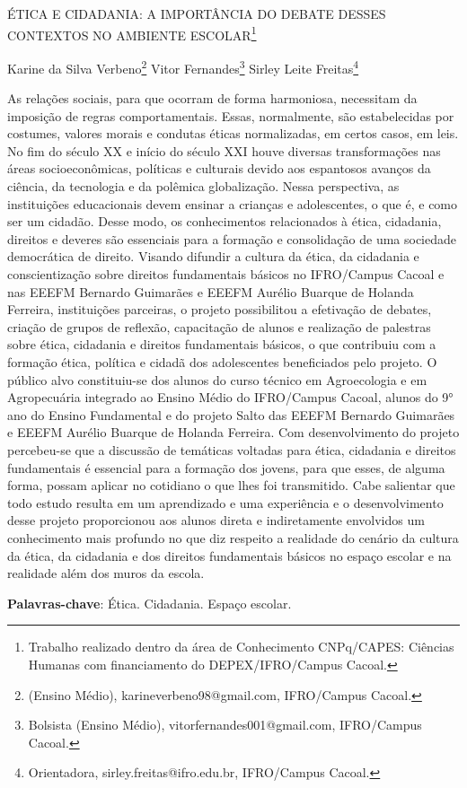 \documentclass[article,12pt,onesidea,4paper,english,brazil]{abntex2}
\begin{document}
	
	
	\frenchspacing 
	
	\begin{center}
		\LARGE ÉTICA E CIDADANIA: A IMPORTÂNCIA DO DEBATE DESSES CONTEXTOS NO AMBIENTE ESCOLAR\footnote{Trabalho realizado dentro da área de Conhecimento CNPq/CAPES: Ciências Humanas com financiamento do DEPEX/IFRO/Campus Cacoal.}
		
		\normalsize
		Karine da Silva Verbeno\footnote{(Ensino Médio), karineverbeno98@gmail.com, IFRO/Campus Cacoal.} 
		Vitor Fernandes\footnote{Bolsista (Ensino Médio), vitorfernandes001@gmail.com, IFRO/Campus Cacoal.} 
		Sirley Leite Freitas\footnote{Orientadora, sirley.freitas@ifro.edu.br, IFRO/Campus Cacoal.} 
	\end{center}
	
	\noindent As relações sociais, para que ocorram de forma harmoniosa, necessitam da imposição de regras comportamentais. Essas, normalmente, são estabelecidas por costumes, valores morais e condutas éticas normalizadas, em certos casos, em leis. No fim do século XX e início do século XXI houve diversas transformações nas áreas socioeconômicas, políticas e culturais devido aos espantosos avanços da ciência, da tecnologia e da polêmica globalização. Nessa perspectiva, as instituições educacionais devem ensinar a crianças e adolescentes, o que é, e como ser um cidadão. Desse modo, os conhecimentos relacionados à ética, cidadania, direitos e deveres são essenciais para a formação e consolidação de uma sociedade democrática de direito. Visando difundir a cultura da ética, da cidadania e conscientização sobre direitos fundamentais básicos no IFRO/Campus Cacoal e nas EEEFM Bernardo Guimarães e EEEFM Aurélio Buarque de Holanda Ferreira, instituições parceiras, o projeto possibilitou a efetivação de debates, criação de grupos de reflexão, capacitação de alunos e realização de palestras sobre ética, cidadania e direitos fundamentais básicos, o que contribuiu com a formação ética, política e cidadã dos adolescentes beneficiados pelo projeto. O público alvo constituiu-se dos alunos do curso técnico em Agroecologia e em Agropecuária integrado ao Ensino Médio do IFRO/Campus Cacoal, alunos do 9° ano do Ensino Fundamental e do projeto Salto das EEEFM Bernardo Guimarães e EEEFM Aurélio Buarque de Holanda Ferreira. Com desenvolvimento do projeto percebeu-se que a discussão de temáticas voltadas para ética, cidadania e direitos fundamentais é essencial para a formação dos jovens, para que esses, de alguma forma, possam aplicar no cotidiano o que lhes foi transmitido. Cabe salientar que todo estudo resulta em um aprendizado e uma experiência e o desenvolvimento desse projeto proporcionou aos alunos direta e indiretamente envolvidos um conhecimento mais profundo no que diz respeito a realidade do cenário da cultura da ética, da cidadania e dos direitos fundamentais básicos no espaço escolar e na realidade além dos muros da escola.
	
	\vspace{\onelineskip}
	
	\noindent
	\textbf{Palavras-chave}: Ética. Cidadania. Espaço escolar.
	
\end{document}
